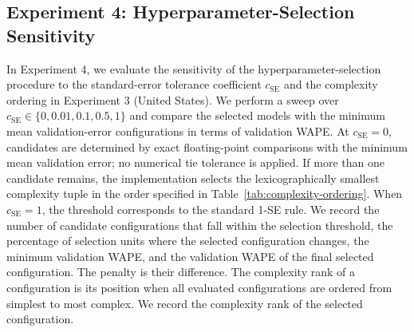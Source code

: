 \subsection{Experiment 4: Hyperparameter-Selection Sensitivity}

In Experiment 4, we evaluate the sensitivity of the hyperparameter-selection procedure to the standard-error tolerance coefficient \(c_{\mathrm{SE}}\) and the complexity ordering in Experiment 3 (United States). We perform a sweep over \(c_{\mathrm{SE}} \in \{0, 0.01, 0.1, 0.5, 1\}\) and compare the selected models with the minimum mean validation-error configurations in terms of validation WAPE. At \(c_{\mathrm{SE}} = 0\), candidates are determined by exact floating-point comparisons with the minimum mean validation error; no numerical tie tolerance is applied. If more than one candidate remains, the implementation selects the lexicographically smallest complexity tuple in the order specified in Table~\ref{tab:complexity-ordering}. When \(c_{\mathrm{SE}} = 1\), the threshold corresponds to the standard 1-SE rule. We record the number of candidate configurations that fall within the selection threshold, the percentage of selection units where the selected configuration changes, the minimum validation WAPE, and the validation WAPE of the final selected configuration. The penalty is their difference. The complexity rank of a configuration is its position when all evaluated configurations are ordered from simplest to most complex. We record the complexity rank of the selected configuration.

